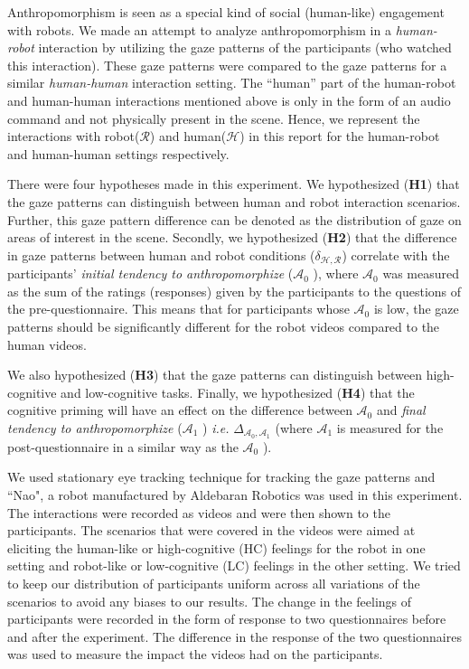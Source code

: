 \documentclass[a4,twocolumn,10pt]{article}
\newcommand{\ie}{{\textit{i.e.\xspace}}}
\newcommand{\anti}{{$\mathcal{A}_0$ }}
\newcommand{\antf}{{$\mathcal{A}_1$ }}
\newcommand{\deltaant}{{ $\Delta_{\mathcal{A}_0,\mathcal{A}_1}$ }}
\begin{document}
Anthropomorphism is seen as a special kind of social (human-like) engagement
with robots. We made an attempt to analyze anthropomorphism in a
\textit{human-robot} interaction by utilizing the gaze patterns of the
participants (who watched this interaction). These gaze patterns were compared
to the gaze patterns for a similar \textit{human-human} interaction setting. The
``human'' part of the human-robot and human-human interactions mentioned above
is only in the form of an audio command and not physically present in the scene.
Hence, we represent the interactions with robot($\mathcal{R}$) and human($\mathcal{H}$) in
this report for the human-robot and human-human settings respectively.

There were four hypotheses made in this experiment. We hypothesized
(\textbf{H1}) that the gaze patterns can distinguish between human and
robot interaction scenarios. Further, this gaze pattern difference can
be denoted as the distribution of gaze on areas of interest in the scene.
Secondly, we hypothesized (\textbf{H2}) that the difference in gaze patterns
between human and robot conditions
($\delta_{\mathcal{H},\mathcal{R}}$) correlate with the participants'
\textit{initial tendency to anthropomorphize} (\anti), where \anti was measured
as the sum of the ratings (responses) given by the participants to the questions
of the pre-questionnaire. This means that for participants whose \anti is low, the
gaze patterns should be significantly different for the robot videos
compared to the human videos.

We also hypothesized (\textbf{H3}) that the gaze patterns can distinguish
between high-cognitive and low-cognitive tasks. Finally, we hypothesized
(\textbf{H4}) that the cognitive priming will have an effect on the difference
between \anti and \textit{final tendency to anthropomorphize} (\antf) \ie
\deltaant (where \antf is measured for the post-questionnaire in a
similar way as the \anti).

We used stationary eye tracking technique for tracking the gaze patterns and
``Nao", a robot manufactured by Aldebaran Robotics was used in this
experiment. The
interactions were recorded as videos and were then shown to the participants.
The scenarios that were covered in the videos were aimed at eliciting the
human-like or high-cognitive (HC) feelings for the robot in one setting and
robot-like or low-cognitive (LC) feelings in the other setting. We tried to keep our distribution of
participants uniform across all variations of the scenarios to avoid any biases
to our results. The change in the feelings of participants were recorded in the
form of response to two questionnaires before and after the experiment. The
difference in the response of the two questionnaires was used to measure the
impact the videos had on the participants. 
\end{document}
